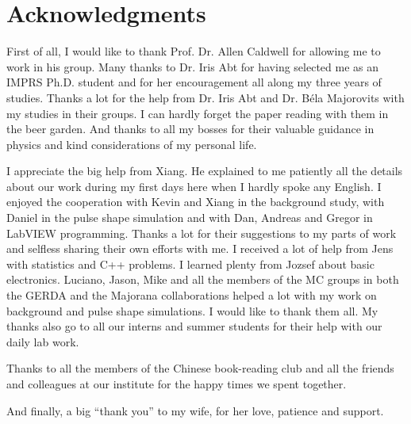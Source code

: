 \chapter{Acknowledgments}
\label{cha:ack}

First of all, I would like to thank Prof. Dr. Allen Caldwell for allowing me to work in his group. Many thanks to Dr. Iris Abt for having selected me as an IMPRS Ph.D. student and for her encouragement all along my three years of studies. Thanks a lot for the help from Dr. Iris Abt and Dr. B\'ela Majorovits with my studies in their groups. I can hardly forget the paper reading with them in the beer garden.  And thanks to all my bosses for their valuable guidance in physics and kind considerations of my personal life.

I appreciate the big help from Xiang. He explained to me patiently all the details about our work during my first days here when I hardly spoke any English. I enjoyed the cooperation with Kevin and Xiang in the background study, with Daniel in the pulse shape simulation and with Dan, Andreas and Gregor in LabVIEW programming. Thanks a lot for their suggestions to my parts of work and selfless sharing their own efforts with me. I received a lot of help from Jens with statistics and C++ problems. I learned plenty from Jozsef about basic electronics. Luciano, Jason, Mike and all the members of the MC groups in both the GERDA and the Majorana collaborations helped a lot with my work on background and pulse shape simulations. I would like to thank them all. My thanks also go to all our interns and summer students for their help with our daily lab work.

Thanks to all the members of the Chinese book-reading club and all the friends and colleagues at our institute for the happy times we spent together.

And finally, a big ``thank you'' to my wife, for her love, patience and support.


